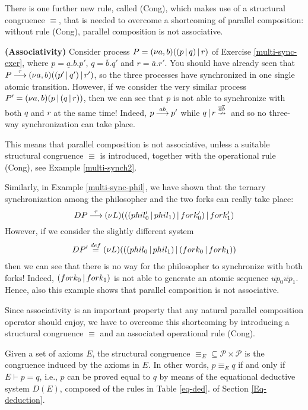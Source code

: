 There is one further new rule, called  (Cong), which makes use of a structural congruence $\equiv$,
that is needed to overcome a shortcoming of parallel composition: without rule (Cong), parallel
composition is not associative.

\begin{example}\label{no-assoc}{\bf (Associativity)}
Consider process $P = \mbox{$({\bf\nu} a,b)$}((p \mbox{$\,|\,$} q) \mbox{$\,|\,$} r)$ of Exercise \ref{multi-sync-exer},
where $p = \underline{a}.b.p'$, $q = \overline{b}.q'$ and $r = \overline{a}.r'$. You should have already
seen that  $P {\mbox{${\:\stackrel{\tau}{\longrightarrow}\:}$}} \mbox{$({\bf\nu} a,b)$}((p' \mbox{$\,|\,$} q') \mbox{$\,|\,$} r')$, so the three processes 
have synchronized in one single atomic transition. However, if we consider the very similar
process $P' = \mbox{$({\bf\nu} a,b)$}(p \mbox{$\,|\,$} (q \mbox{$\,|\,$} r))$, then we can see that $p$ is not able to synchronize
with both $q$ and $r$ at the same time! Indeed, $p {\mbox{${\:\stackrel{ab}{\longrightarrow}\:}$}}p'$ while $q \mbox{$\,|\,$} r {\mbox{${\:\stackrel{\overline{a}\overline{b}}{\nrightarrow}\:}$}}$
and so no three-way synchronization can take place.

This means that parallel composition is not associative, unless a suitable structural congruence $\equiv$ 
is introduced, together with the operational rule (Cong), see Example \ref{multi-synch2}.

Similarly, in Example \ref{multi-sync-phil}, we have shown that the ternary synchronization among
the philosopher and the two forks can really take place:
\[
DP {\mbox{${\:\stackrel{\tau}{\longrightarrow}\:}$}}  \mbox{$({\bf\nu} L)$}(((phil'_0\mbox{$\,|\,$} phil_1) \mbox{$\,|\,$} fork'_0) \mbox{$\,|\,$} fork'_1) 
\]
However, if we consider the slightly different system 
\begin{eqnarray*}
DP' \;  {\mbox{${\stackrel{def}{=}}$}} \;  \mbox{$({\bf\nu} L)$}(((phil_0\mbox{$\,|\,$} phil_1) \mbox{$\,|\,$} (fork_0 \mbox{$\,|\,$} fork_1))
\end{eqnarray*}
then we can see that there is no way for the philosopher to synchronize with both forks! 
Indeed, $(fork_0 \mbox{$\,|\,$} fork_1)$ is not able to generate an atomic sequence $\overline{up}_0 \overline{up}_1$.
Hence, also this example shows that parallel composition is not associative.
\fine
\end{example}

Since associativity is an important property that
any natural parallel composition operator should enjoy, we have to overcome this shortcoming by introducing
a structural congruence $\equiv$  and an associated operational rule (Cong).

Given a set of axioms $E$, the structural congruence $\equiv_E \subseteq {\mathcal P} \times {\mathcal P}$ is the 
congruence induced by the axioms in $E$. In other words, $p \equiv_E q$ if and only if $E \vdash p = q$, i.e., $p$ can be proved
equal to $q$ by means of the equational deductive system $D(E)$, composed of the rules in Table \ref{eq-ded}.
of Section \ref{Eq-deduction}.

